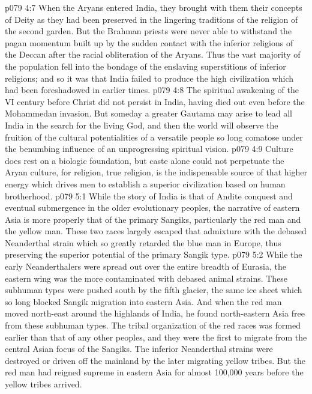 \vs p079 4:7 When the Aryans entered India, they brought with them their concepts of Deity as they had been preserved in the lingering traditions of the religion of the second garden. But the Brahman priests were never able to withstand the pagan momentum built up by the sudden contact with the inferior religions of the Deccan after the racial obliteration of the Aryans. Thus the vast majority of the population fell into the bondage of the enslaving superstitions of inferior religions; and so it was that India failed to produce the high civilization which had been foreshadowed in earlier times.
\vs p079 4:8 The spiritual awakening of the VI century before Christ did not persist in India, having died out even before the Mohammedan invasion. But someday a greater Gautama may arise to lead all India in the search for the living God, and then the world will observe the fruition of the cultural potentialities of a versatile people so long comatose under the benumbing influence of an unprogressing spiritual vision.
\vs p079 4:9 Culture does rest on a biologic foundation, but caste alone could not perpetuate the Aryan culture, for religion, true religion, is the indispensable source of that higher energy which drives men to establish a superior civilization based on human brotherhood.
\vs p079 5:1 While the story of India is that of Andite conquest and eventual submergence in the older evolutionary peoples, the narrative of eastern Asia is more properly that of the primary Sangiks, particularly the red man and the yellow man. These two races largely escaped that admixture with the debased Neanderthal strain which so greatly retarded the blue man in Europe, thus preserving the superior potential of the primary Sangik type.
\vs p079 5:2 While the early Neanderthalers were spread out over the entire breadth of Eurasia, the eastern wing was the more contaminated with debased animal strains. These subhuman types were pushed south by the fifth glacier, the same ice sheet which so long blocked Sangik migration into eastern Asia. And when the red man moved north\hyp{}east around the highlands of India, he found north\hyp{}eastern Asia free from these subhuman types. The tribal organization of the red races was formed earlier than that of any other peoples, and they were the first to migrate from the central Asian focus of the Sangiks. The inferior Neanderthal strains were destroyed or driven off the mainland by the later migrating yellow tribes. But the red man had reigned supreme in eastern Asia for almost 100,000 years before the yellow tribes arrived.
